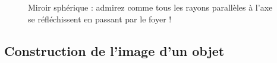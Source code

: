 \begin{figure}
\centering
{}
\caption{Miroir sphérique : admirez comme tous les rayons parallèles à l'axe se réfléchissent en passant par le foyer !}  \label{FigPasageFoyer}
\end{figure}

\subsection{Construction de l'image d'un objet}

